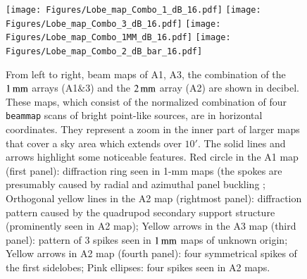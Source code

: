\documentclass[traditionalabstract]{aa}
\newcommand{\rev}[1]{#1}
\begin{document}
\begin{figure}[!thbp] 
\begin{center}
\texttt{[image: Figures/Lobe\_map\_Combo\_1\_dB\_16.pdf]}
\texttt{[image: Figures/Lobe\_map\_Combo\_3\_dB\_16.pdf]}
\texttt{[image: Figures/Lobe\_map\_Combo\_1MM\_dB\_16.pdf]}
\texttt{[image: Figures/Lobe\_map\_Combo\_2\_dB\_bar\_16.pdf]}
\caption[Noticeable features of NIKA2 beam pattern.]{From left
to right, beam maps of A1, A3, the combination of the $1\,\rm{mm}$ arrays (A1$\&$3) and the
$2\,\rm{mm}$ array (A2) are shown in decibel. These maps, which
consist of the normalized combination of four {\tt beammap} scans of
bright point-like sources, are in horizontal coordinates. {\rev They
represent a zoom in the inner part of larger maps that cover a
sky area which extends over $10'$.} 
The solid lines and arrows highlight some noticeable features.
Red circle in the A1 map (first panel): diffraction ring seen in 1-mm maps
(the spokes are presumably caused by radial and azimuthal panel
buckling \citep{Greve2010}; Orthogonal yellow lines in the A2 map
(rightmost panel): diffraction pattern caused by the quadrupod
secondary support structure (prominently
seen in A2 map); Yellow arrows in the A3 map (third panel):
pattern of 3 spikes seen in $1\,\rm{mm}$ maps of unknown origin; Yellow
arrows in A2 map (fourth panel): four symmetrical spikes of the
first sidelobes; Pink ellipses: four spikes seen in A2 maps.}
\label{fig:features}
\end{center}
\end{figure}
\end{document}

